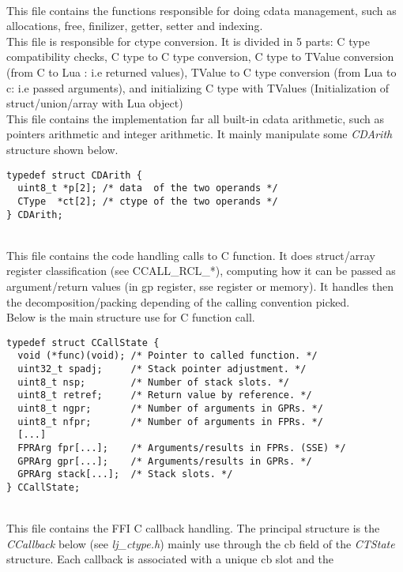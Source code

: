 \\
This file contains the functions responsible for doing cdata management, such as
allocations, free, finilizer, getter, setter and indexing.
\\
This file is responsible for ctype conversion. It is divided in 5 parts: C type
compatibility checks, C type to C type conversion, C type to TValue conversion
(from C to Lua : i.e returned values), TValue to C type conversion (from Lua to
c: i.e passed arguments), and initializing C type with TValues (Initialization
of struct/union/array with Lua object)
\\%
This file contains the implementation far all built-in cdata arithmetic, such
as pointers arithmetic and integer arithmetic. It mainly manipulate some
\emph{CDArith} structure shown below.
\begin{lstlisting}[style=CStyle]
typedef struct CDArith {
  uint8_t *p[2]; /* data  of the two operands */
  CType  *ct[2]; /* ctype of the two operands */
} CDArith;
\end{lstlisting}
\\
This file contains the code handling calls to C function. It does struct/array
register classification (see CCALL\_RCL\_*), computing how it can be passed
as argument/return values (in gp register, sse register or memory). It handles
then the decomposition/packing depending of the calling convention picked.
\\
Below is the main structure use for C function call.
\begin{lstlisting}[style=CStyle]
typedef struct CCallState {
  void (*func)(void); /* Pointer to called function. */
  uint32_t spadj;     /* Stack pointer adjustment. */
  uint8_t nsp;        /* Number of stack slots. */
  uint8_t retref;     /* Return value by reference. */
  uint8_t ngpr;       /* Number of arguments in GPRs. */
  uint8_t nfpr;       /* Number of arguments in FPRs. */
  [...]
  FPRArg fpr[...];    /* Arguments/results in FPRs. (SSE) */
  GPRArg gpr[...];    /* Arguments/results in GPRs. */
  GPRArg stack[...];  /* Stack slots. */
} CCallState;
\end{lstlisting}
\\
This file contains the FFI C callback handling. The principal structure is the
\emph{CCallback} below (see \emph{lj\_ctype.h}) mainly use through the cb field
of the \emph{CTState}
structure. Each callback is associated with a unique cb slot and the
